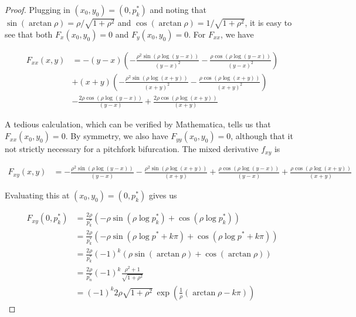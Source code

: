 \documentclass[thesis.tex]{subfiles}
\begin{document}
\begin{lemma}
\begin{proof}
Plugging in $(x_0, y_0) = \left(0, p^*_k \right)$ and noting that $\sin(\arctan \rho) = \rho / \sqrt{1 + \rho^2}$ and $\cos(\arctan \rho) = 1 / \sqrt{1 + \rho^2}$, it is easy to see that both $F_x(x_0, y_0) = 0$ and $F_y(x_0, y_0) = 0$. For $F_{xx}$, we have

\begin{align*}
F_{xx}(x, y) &= 
-(y-x) \left(-\frac{\rho^2 \sin \left(\rho \log (y-x)\right)}{(y-x)^2}-\frac{\rho
   \cos \left(\rho \log (y-x) \right)}{(y-x)^2}\right)\\
   &+(x+y) \left(-\frac{\rho^2
   \sin \left(\rho \log (x+y)\right)}{(x+y)^2}-\frac{\rho \cos \left( \rho
   \log (x+y)\right)}{(x+y)^2}\right)\\
   &-\frac{2 \rho \cos \left(\rho \log
   (y-x) \right)}{(y-x)}+\frac{2 \rho \cos \left( \rho \log (x+y) \right)}{
   (x+y)}
\end{align*}

A tedious calculation, which can be verified by Mathematica, tells us that $F_{xx}(x_0, y_0) = 0$. By symmetry, we also have $F_{yy}(x_0, y_0) = 0$, although that it not strictly necessary for a pitchfork bifurcation. The mixed derivative $f_{xy}$ is

\begin{align*}
F_{xy}(x, y) &= -\frac{\rho^2 \sin \left(\rho \log (y-x)\right)}{(y-x)}-\frac{\rho^2 \sin
   \left(\rho \log (x+y)\right)}{(x+y)}+\frac{\rho \cos \left(\rho \log (y-x)\right)}{(y-x)}+\frac{\rho \cos \left( \rho \log (x+y) \right)}{(x+y)}
\end{align*}

Evaluating this at $(x_0, y_0) = \left(0, p^*_k \right)$ gives us

\begin{align*}
F_{xy}(0, p^*_k) &= \frac{2 \rho}{p^*_k}\left( -\rho \sin \left(\rho \log p^*_k \right) + \cos \left(\rho \log p^*_k \right) \right)\\
&= \frac{2 \rho}{p^*_k}\left( -\rho \sin \left(\rho \log p^* + k \pi \right) + \cos \left(\rho \log p^* + k \pi \right) \right) \\
&= \frac{2 \rho}{p^*_k} (-1)^k \left( \rho \sin \left(\arctan \rho \right) + \cos \left(\arctan \rho \right) \right)\\ 
&= \frac{2 \rho}{p_n^*} (-1)^k \frac{\rho^2 + 1}{\sqrt{1 + \rho^2}} \\
&= (-1)^k 2 \rho \sqrt{1 + \rho^2} \: \exp{\left(\frac{1}{\rho} (\arctan \rho - k \pi) \right)}
\end{align*}


\end{proof}
\end{lemma}
\end{document}
